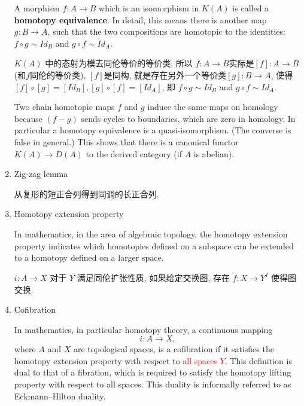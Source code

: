 \documentclass{ctexart}
\begin{document}
\begin{enumerate}
A morphism $f:A\rightarrow B$ which is an isomorphism in $K(A)$ is called a \textbf{homotopy equivalence}. In detail, this means there is another map $g : B\rightarrow A$, such that the two compositions are homotopic to the identities: $f\circ g\sim Id_{B}$ and $g\circ f\sim Id_{A}$.

$K(A)$ 中的态射为模去同伦等价的等价类, 所以 $f:A\to B$实际是$[f]:A\to B$(和$f$同伦的等价类), $[f]$是同构, 就是存在另外一个等价类$[g]:B\to A$, 使得 $[f]\circ [g] = [Id_B], [g]\circ [f]=[Id_A]$, 即 $f\circ g\sim Id_{B}$ and $g\circ f\sim Id_{A}$.

Two chain homotopic maps $f$ and $g$ induce the same maps on homology because $(f − g)$ sends cycles to boundaries, which are zero in homology. In particular a homotopy equivalence is a quasi-isomorphism. (The converse is false in general.) This shows that there is a canonical functor $K(A)\rightarrow D(A)$ to the derived category (if $A$ is abelian).

\item Zig-zag lemma

从复形的短正合列得到同调的长正合列.


\item Homotopy extension property

In mathematics, in the area of algebraic topology, the homotopy extension property indicates which homotopies defined on a subspace can be extended to a homotopy defined on a larger space.
\begin{center}
\end{center}
$i : A \to X$ 对于 $Y$ 满足同伦扩张性质, 如果给定交换图, 存在 $\tilde{f} : X\to Y^I$ 使得图交换.

\item Cofibration

In mathematics, in particular homotopy theory, a continuous mapping
\[
i\colon A\to X,
\]
where $A$ and $X$ are topological spaces, is a cofibration if it satisfies the homotopy extension property with respect to \textcolor{red}{all spaces $Y$}. This definition is dual to that of a fibration, which is required to satisfy the homotopy lifting property with respect to all spaces. This duality is informally referred to as Eckmann–Hilton duality.


\end{enumerate}
\end{document}
